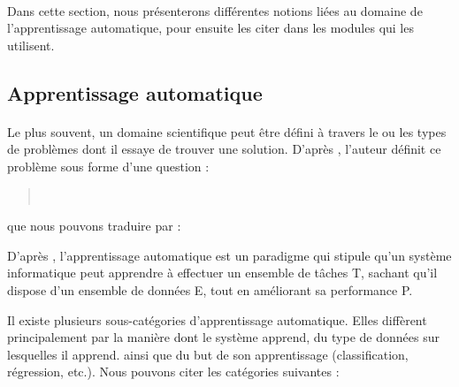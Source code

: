 \paragraph{}
Dans cette section, nous présenterons différentes notions liées au domaine de l'apprentissage automatique, pour ensuite les citer dans les modules qui les utilisent. 
\subsection{Apprentissage automatique}
\paragraph{}
Le plus souvent, un domaine scientifique peut être défini à travers le ou les types de problèmes dont il essaye de trouver une solution. D'après \citep{mitchelllearning}, l'auteur définit ce problème sous forme d'une question :
\begin{quote}
	\\\citep{mitchelllearning}
\end{quote}
que nous pouvons traduire par :
\begin{quote}
\end{quote}
\par 
D'après \citep{mitchelllearning}, l'apprentissage automatique est un paradigme qui stipule qu'un système informatique peut apprendre à effectuer un ensemble de tâches T, sachant qu'il dispose d'un ensemble de données E, tout en améliorant sa performance P.
\par
Il existe plusieurs sous-catégories d'apprentissage automatique. Elles diffèrent principalement par la manière dont le système apprend, du type de données sur lesquelles il apprend. ainsi que du but de son apprentissage (classification, régression, etc.). Nous pouvons citer les catégories suivantes :
